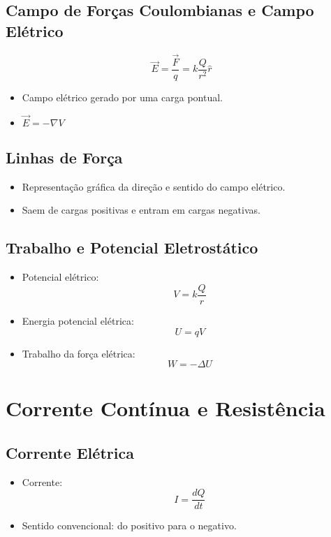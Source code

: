 \documentclass[a4paper,12pt]{article}
\begin{document}
\begin{multicols}{2}
\subsection{Campo de Forças Coulombianas e Campo Elétrico}
\begin{equation*}
    \vec{E} = \frac{\vec{F}}{q} = k \frac{Q}{r^2} \hat{r}
\end{equation*}
\begin{itemize}
    \item Campo elétrico gerado por uma carga pontual.
    \item $\vec{E} = - \nabla V$
\end{itemize}

\subsection{Linhas de Força}
\begin{itemize}
    \item Representação gráfica da direção e sentido do campo elétrico.
    \item Saem de cargas positivas e entram em cargas negativas.
\end{itemize}

\subsection{Trabalho e Potencial Eletrostático}
\begin{itemize}
    \item Potencial elétrico: 
    \[
        V = k \frac{Q}{r}
    \]
    \item Energia potencial elétrica: 
    \[
        U = qV
    \]
    \item Trabalho da força elétrica:
    \[
        W = -\Delta U
    \]
\end{itemize}

\section{Corrente Contínua e Resistência}

\subsection{Corrente Elétrica}
\begin{itemize}
    \item Corrente: 
    \[
        I = \frac{dQ}{dt}
    \]
    \item Sentido convencional: do positivo para o negativo.
\end{itemize}


\end{multicols}
\end{document}
